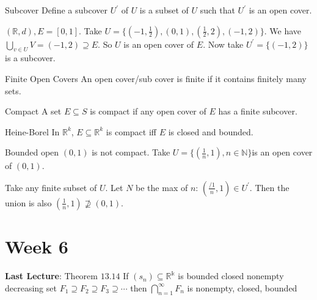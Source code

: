 \documentclass{report}
\begin{document}
\begin{definition}{Subcover}
    Define a subcover $U^{\prime}$ of $U$ is a subset of $U$ such that $U^{\prime}$ is an open cover.
\end{definition}

\begin{examples}
    \begin{example}
        $(\mathbb{R}, d), E  = [0, 1]$. Take $U = \{(-1, \frac{1}{2}), (0, 1), (\frac{1}{2}, 2), (-1, 2)\}$. We have $\bigcup_{v \in U}^{}  V = (-1, 2) \supseteq E$. So $U$ is an open cover of $E$. Now take $U^{\prime} = \{(-1, 2)\}$ is a subcover.
    \end{example}
\end{examples}

\begin{definition}{Finite Open Covers}
    An open cover/sub cover is finite if it contains finitely many sets.
\end{definition}

\begin{definition}{Compact}
    A set $E \subseteq S$ is compact if any open cover of $E$ has a finite subcover.
\end{definition}

\begin{theorem}{Heine-Borel}
    In $\mathbb{R}^{k}$, $E \subseteq \mathbb{R}^{k}$ is compact iff $E$ is closed and bounded.
\end{theorem}

\begin{examples}
    \begin{example}
        Bounded open $(0, 1)$ is not compact. Take $U = \{(\frac{1}{n}, 1), n \in \mathbb{N}\}$is an open cover of $(0, 1)$.
    \end{example}
\end{examples}

Take any finite subset of $U$. Let $N$ be the max of $n$: $(\frac{/1}{n}, 1) \in U^{\prime}$. Then the union is also $(\frac{1}{n}, 1) \not\supseteq (0, 1)$.

\chapter{Week 6}

\textbf{Last Lecture}: Theorem $13.14$ If $(s_{n}) \subseteq \mathbb{R^{k}}$ is bounded closed nonempty decreasing set $F_{1} \supseteq F_{2} \supseteq F_{3} \supseteq \cdots $ then $\bigcap_{n = 1}^{\infty} F_{n}$ is nonempty, closed, bounded 
\end{document}
